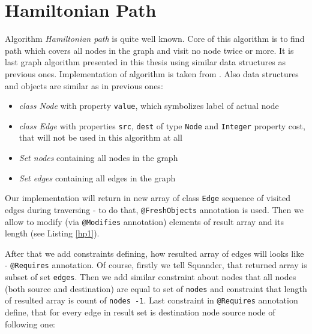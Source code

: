 \documentclass[11pt,twoside,a4paper]{book}
\begin{document}
\section{Hamiltonian Path}
\label{sec:hp}
Algorithm \textit{Hamiltonian path} is quite well known. Core of this algorithm
is to find path which covers all nodes in the graph and visit no node twice or
more. It is last graph algorithm presented in this thesis using similar data
structures as previous ones. Implementation of algorithm is taken from
\cite{milicevic:executableSpecificationsForJavaPrograms}. Also data structures
and objects are similar as in previous ones:

\begin{itemize}
  \item \textit{class Node} with property \verb|value|, which symbolizes label
  of actual node
  \item \textit{class Edge} with properties \verb|src|, \verb|dest| of type
  \verb|Node| and \verb|Integer| property cost, that will not be used in this
  algorithm at all
  \item \textit{Set nodes} containing all nodes in the graph
	\item \textit{Set edges} containing all edges in the graph
\end{itemize}

Our implementation will return in new array of class \verb|Edge| sequence of
visited edges during traversing - to do that, \verb|@FreshObjects| annotation is
used. Then we allow to modify (via \verb|@Modifies| annotation) elements of
result array and its length (see Listing \ref{hp1}).



After that we add constraints defining, how resulted array of edges will looks
like - \verb|@Requires| annotation. Of course, firstly we tell Squander, that
returned array is subset of set \verb|edges|. Then we add similar constraint about nodes that all nodes
(both source and destination) are equal to set of \verb|nodes| and constraint
that length of resulted array is count of \verb|nodes -1|. Last constraint in
\verb|@Requires| annotation define, that for every edge in result set is
destination node source node of following one:


\end{document}
